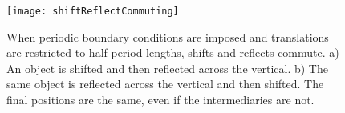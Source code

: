 \begin{figure}[t!]
\texttt{[image: shiftReflectCommuting]}
\caption[When periodic boundary conditions are imposed and translations are restricted to half-period lengths, shifts and reflects commute.]{When periodic boundary conditions are imposed and translations are restricted to half-period lengths, shifts and reflects commute. a) An object is shifted and then reflected across the vertical. b) The same object is reflected across the vertical and then shifted. The final positions are the same, even if the intermediaries are not.}\label{fig:abelian}
\end{figure}
  
